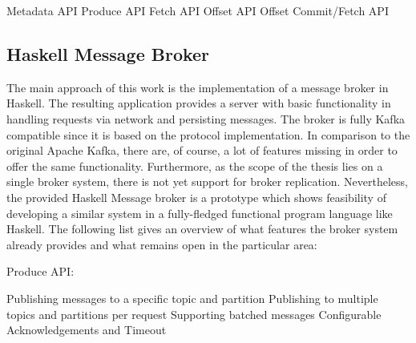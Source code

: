 \begin{itemize}
    \tick Metadata API
    \tick Produce API
    \tick Fetch API
    \fail Offset API
    \fail Offset Commit/Fetch API
\end{itemize}
\newpage
\subsection{Haskell Message Broker}

The main approach of this work is the implementation of a message broker in
Haskell. The resulting application provides a server with basic functionality in
handling requests via network and persisting messages. The broker is fully Kafka
compatible since it is based on the protocol implementation.  In comparison to the
original Apache Kafka, there are, of course, a lot of features missing in order to offer the
same functionality. Furthermore, as the scope of the thesis lies on a single
broker system, there is not yet support for broker replication. Nevertheless, the
provided Haskell Message broker is a prototype which shows feasibility of
developing a similar system in a fully-fledged functional program language like
Haskell. The following list gives an overview of what features the broker system
already provides and what remains open in the particular area:

Produce API:
\begin{itemize}
        \tick Publishing messages to a specific topic and partition
        \tick Publishing to multiple topics and partitions per request
        \tick Supporting batched messages
        \fail Configurable Acknowledgements and Timeout
\end{itemize}

